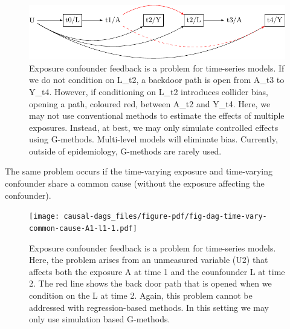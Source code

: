 \documentclass[
  singlecolumn]{report}
\begin{document}
\begin{figure}

{\centering \includegraphics[width=1\textwidth,height=\textheight]{causal-dags_files/figure-pdf/fig-dag-9-1.pdf}

}

\caption{\label{fig-dag-9}Exposure confounder feedback is a problem for
time-series models. If we do not condition on L\_t2, a backdoor path is
open from A\_t3 to Y\_t4. However, if conditioning on L\_t2 introduces
collider bias, opening a path, coloured red, between A\_t2 and Y\_t4.
Here, we may not use conventional methods to estimate the effects of
multiple exposures. Instead, at best, we may only simulate controlled
effects using G-methods. Multi-level models will eliminate bias.
Currently, outside of epidemiology, G-methods are rarely used.}

\end{figure}

The same problem occurs if the time-varying exposure and time-varying
confounder share a common cause (without the exposure affecting the
confounder).

\begin{figure}

{\centering \texttt{[image: causal-dags\_files/figure-pdf/fig-dag-time-vary-common-cause-A1-l1-1.pdf]}

}

\caption{\label{fig-dag-time-vary-common-cause-A1-l1}Exposure confounder
feedback is a problem for time-series models. Here, the problem arises
from an unmeasured variable (U2) that affects both the exposure A at
time 1 and the counfounder L at time 2. The red line shows the back door
path that is opened when we condition on the L at time 2. Again, this
problem cannot be addressed with regression-based methods. In this
setting we may only use simulation based G-methods.}

\end{figure}
\end{document}
